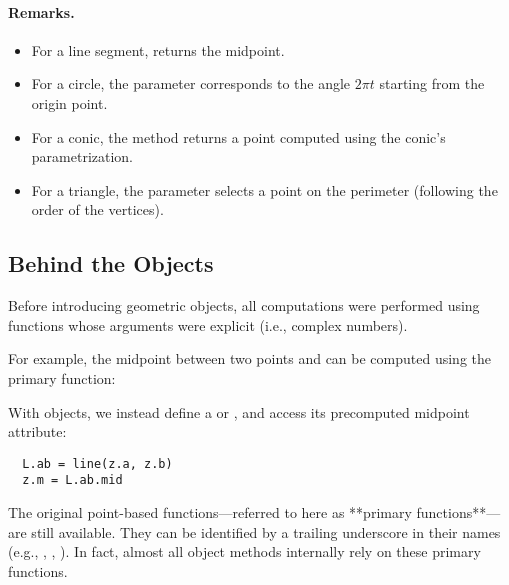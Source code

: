 \paragraph{Remarks.}
\begin{itemize}
  \item For a line segment,  returns the midpoint.
  \item For a circle, the parameter corresponds to the angle \( 2\pi t \) starting from the origin point.
  \item For a conic, the method returns a point computed using the conic’s parametrization.
  \item For a triangle, the parameter selects a point on the perimeter (following the order of the vertices).
\end{itemize}

\subsection{Behind the Objects} %
\label{sub:behind_the_objects}

Before introducing geometric objects, all computations were performed using functions whose arguments were explicit  (i.e., complex numbers).

For example, the midpoint between two points  and  can be computed using the primary function:
\begin{center}
\end{center}

With objects, we instead define a  or , and access its precomputed midpoint attribute:

\begin{center}
\begin{minipage}{0.5\textwidth}
\begin{mybox}
\begin{verbatim}
  L.ab = line(z.a, z.b)
  z.m = L.ab.mid
\end{verbatim}
\end{mybox}
\end{minipage}
\end{center}

\vspace{1em}
The original point-based functions—referred to here as **primary functions**—are still available. They can be identified by a trailing underscore in their names (e.g., , , ). In fact, almost all object methods internally rely on these primary functions.

